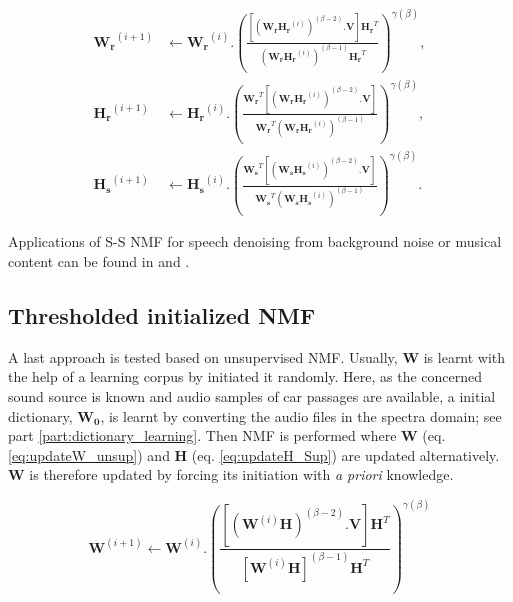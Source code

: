\documentclass[twocolumn,a4paper,10pt]{article}
\begin{document}
{\scriptsize
\begin{subequations}\label{eq:WH-SSupdate}
\begin{align}
\mathbf{W_r}^{(i+1)} &\leftarrow \mathbf{W_r}^{(i)}.\left(\frac{\left[\left(\mathbf{W_r H_r}^{(i)} \right)^{(\beta-2)}.\mathbf{V} \right]\mathbf{H_r}^T}{\left(\mathbf{W_r H_r}^{(i)} \right)^{(\beta-1)}\mathbf{H_r}^T}\right)^{\gamma(\beta)}, \label{eq:W_r_SS}\\
\mathbf{H_r}^{(i+1)} &\leftarrow \mathbf{H_r}^{(i)}.\left(\frac{\mathbf{W_r}^T \left[\left(\mathbf{W_r H_r}^{(i)} \right)^{(\beta-2)}.\mathbf{V} \right]}{\mathbf{W_r}^T \left(\mathbf{W_r H_r}^{(i)} \right)^{(\beta-1)}}\right)^{\gamma(\beta)}, \label{eq:H_r_SS}\\
\mathbf{H_s}^{(i+1)} &\leftarrow \mathbf{H_s}^{(i)}.\left(\frac{\mathbf{W_s}^T \left[\left(\mathbf{W_s H_s}^{(i)} \right)^{(\beta-2)}.\mathbf{V} \right]}{\mathbf{W_s}^T \left(\mathbf{W_s H_s}^{(i)} \right)^{(\beta-1)}}\right)^{\gamma(\beta)}.\label{eq:H_s_SS}
\end{align}
\end{subequations}}

Applications of S-S NMF for speech denoising from background noise or musical content can be found in \cite{joder2012real} and \cite{weninger2012supervised}.

\subsection{Thresholded initialized NMF}

A last approach is tested based on unsupervised NMF. Usually, $\mathbf{W}$ is learnt with the help of a learning corpus by initiated it randomly. Here, as the concerned sound source is known and audio samples of car passages are available, a initial dictionary, $\mathbf{W_0}$, is learnt by converting the audio files in the spectra domain; see part \ref{part:dictionary_learning}. Then NMF is performed where $\mathbf{W}$ (eq. \ref{eq:updateW_unsup}) and $\mathbf{H}$ (eq.  \ref{eq:updateH_Sup}) are updated alternatively. $\mathbf{W}$ is therefore updated by forcing its initiation with \textit{a priori} knowledge.

\begin{equation}\label{eq:updateW_unsup}
\textbf{W}^{(i+1)} \leftarrow \mathbf{W}^{(i)}.\left(\frac{\left[\left(\mathbf{W}^{(i)}\mathbf{H} \right)^{(\beta-2)}.\mathbf{V} \right]\mathbf{H}^T}{\left[\mathbf{W}^{(i)}\mathbf{H} \right]^{(\beta-1)}\mathbf{H}^T}\right)^{\gamma(\beta)}
\end{equation}
\end{document}
